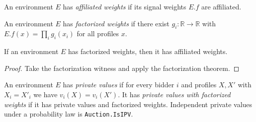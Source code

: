 \begin{definition}\label{def:MathEconLib.Auction.Affiliation.HasAffiliatedWeights}
\leanok
{}
An environment $E$ has \emph{affiliated weights} if its signal weights $E.f$ are affiliated.
\end{definition}

\begin{definition}\label{def:MathEconLib.Auction.Affiliation.HasFactorizedWeights}
\leanok
{}
An environment $E$ has \emph{factorized weights} if there exist $g_i : \mathbb{R} \to \mathbb{R}$ with $E.f(x) = \prod_i g_i(x_i)$ for all profiles $x$.
\end{definition}

\begin{theorem}\label{thm:MathEconLib.Auction.Affiliation.HasFactorizedWeights.hasAffiliatedWeights}
\leanok
{}
If an environment $E$ has factorized weights, then it has affiliated weights.
\end{theorem}

\begin{proof}
\leanok
{}
Take the factorization witness and apply the factorization theorem.
\end{proof}

\begin{definition}\label{def:MathEconLib.Auction.Affiliation.IsPrivateValuesWithFactorizedWeights}
\leanok
{}
An environment $E$ has \emph{private values} if for every bidder $i$ and profiles $X, X'$ with $X_i = X'_i$ we have $v_i(X) = v_i(X')$. It has \emph{private values with factorized weights} if it has private values and factorized weights. Independent private values under a probability law is \texttt{Auction.IsIPV}.
\end{definition}

